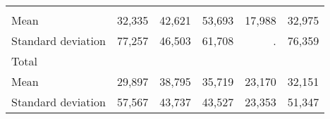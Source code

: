 \begin{tabular}{llllll}
  \multicolumn{1}{r}{} &
  \multicolumn{1}{r}{} &
  \multicolumn{1}{r}{} &
  \multicolumn{1}{r}{} \\
\multicolumn{1}{l}{\hspace{4em}Mean} &
  \multicolumn{1}{|r}{32,335} &
  \multicolumn{1}{r}{42,621} &
  \multicolumn{1}{r}{53,693} &
  \multicolumn{1}{r}{17,988} &
  \multicolumn{1}{r}{32,975} \\
\multicolumn{1}{l}{\hspace{4em}Standard deviation} &
  \multicolumn{1}{|r}{77,257} &
  \multicolumn{1}{r}{46,503} &
  \multicolumn{1}{r}{61,708} &
  \multicolumn{1}{r}{.} &
  \multicolumn{1}{r}{76,359} \\
\multicolumn{1}{l}{\hspace{3em}Total} &
  \multicolumn{1}{|r}{} &
  \multicolumn{1}{r}{} &
  \multicolumn{1}{r}{} &
  \multicolumn{1}{r}{} &
  \multicolumn{1}{r}{} \\
\multicolumn{1}{l}{\hspace{4em}Mean} &
  \multicolumn{1}{|r}{29,897} &
  \multicolumn{1}{r}{38,795} &
  \multicolumn{1}{r}{35,719} &
  \multicolumn{1}{r}{23,170} &
  \multicolumn{1}{r}{32,151} \\
\multicolumn{1}{l}{\hspace{4em}Standard deviation} &
  \multicolumn{1}{|r}{57,567} &
  \multicolumn{1}{r}{43,737} &
  \multicolumn{1}{r}{43,527} &
  \multicolumn{1}{r}{23,353} &
  \multicolumn{1}{r}{51,347} \\
\cline{1-6}
\end{tabular}

